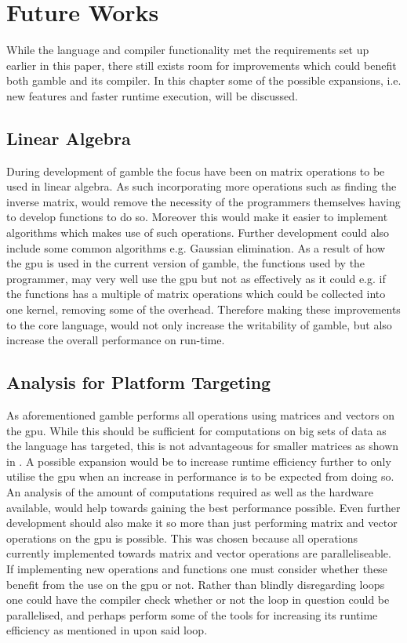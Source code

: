 \chapter{Future Works}\label{cha:future_works}
While the language and compiler functionality met the requirements set up earlier in this paper, there still exists room for improvements which could benefit both \gls{gamble} and its compiler.
In this chapter some of the possible expansions, i.e. new features and faster runtime execution, will be discussed.

\section{Linear Algebra}\label{improve:LIAL}
During development of \gls{gamble} the focus have been on matrix operations to be used in linear algebra.
As such incorporating more operations such as finding the inverse matrix, would remove the necessity of the programmers themselves having to develop functions to do so.
Moreover this would make it easier to implement algorithms which makes use of such operations.
Further development could also include some common algorithms e.g. Gaussian elimination.
As a result of how the \acrshort{gpu} is used in the current version of \gls{gamble}, the functions used by the programmer, may very well use the \acrshort{gpu} but not as effectively as it could e.g. if the functions has a multiple of matrix operations which could be collected into one kernel, removing some of the overhead.
Therefore making these improvements to the core language, would not only increase the writability of \gls{gamble}, but also increase the overall performance on run-time.

\section{Analysis for Platform Targeting}
As aforementioned \gls{gamble} performs all operations using matrices and vectors on the \acrshort{gpu}.
While this should be sufficient for computations on big sets of data as the language has targeted, this is not advantageous for smaller matrices as shown in .
A possible expansion would be to increase runtime efficiency further to only utilise the \acrshort{gpu} when an increase in performance is to be expected from doing so.
An analysis of the amount of computations required as well as the hardware available, would help towards gaining the best performance possible.
Even further development should also make it so more than just performing matrix and vector operations on the \acrshort{gpu} is possible.
This was chosen because all operations currently implemented towards matrix and vector operations are paralleliseable.
If implementing new operations and functions one must consider whether these benefit from the use on the \acrshort{gpu} or not.
Rather than blindly disregarding loops one could have the compiler check whether or not the loop in question could be parallelised, and perhaps perform some of the tools for increasing its runtime efficiency as mentioned in  upon said loop.
 
